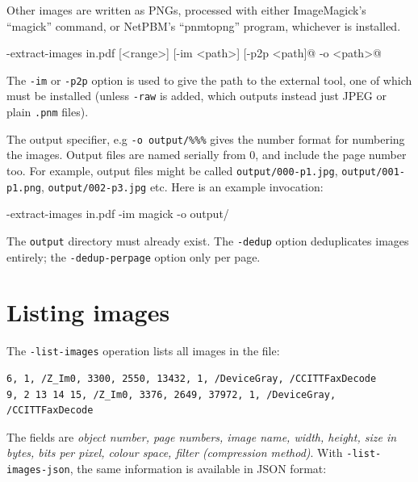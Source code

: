 \documentclass{book}
\begin{document}
Other images are written as PNGs, processed with either ImageMagick's ``magick'' command, or NetPBM's ``pnmtopng'' program, whichever is installed.

  \begin{framed}
  \noindent\small\verb@cpdf -extract-images in.pdf [<range>] [-im <path>] [-p2p <path]@
  \noindent\small{} -o <path>@
  \end{framed}

\noindent The \texttt{-im} or \texttt{-p2p} option is used to give the path to the external tool, one of which must be installed (unless \texttt{-raw} is added, which outputs instead just JPEG or plain \texttt{.pnm} files).

The output specifier, e.g \verb!-o output/%%%! gives the number format for numbering the images. Output files are named serially from 0, and include the page number too. For example, output files might be called \texttt{output/000-p1.jpg}, \texttt{output/001-p1.png}, \texttt{output/002-p3.jpg} etc. Here is an example invocation:

  \begin{framed}
  \noindent\small\verb@cpdf -extract-images in.pdf -im magick -o output/%%%@
  \end{framed}

\noindent The \texttt{output} directory must already exist. The \texttt{-dedup} option deduplicates images entirely; the \texttt{-dedup-perpage} option only per page.

\section{Listing images}

The \texttt{-list-images} operation lists all images in the file:

  \begin{framed}
{\small\begin{verbatim}6, 1, /Z_Im0, 3300, 2550, 13432, 1, /DeviceGray, /CCITTFaxDecode
9, 2 13 14 15, /Z_Im0, 3376, 2649, 37972, 1, /DeviceGray, /CCITTFaxDecode\end{verbatim}}
  \end{framed}

\noindent The fields are \textit{object number, page numbers, image name, width, height, size in bytes, bits per pixel, colour space, filter (compression method)}. With \texttt{-list-images-json}, the same information is available in JSON format:
\end{document}
